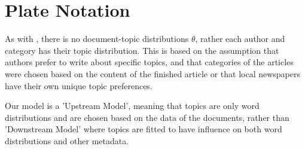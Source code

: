 \section{Plate Notation}
As with , there is no document-topic distributions $\theta$, rather each author and category has their topic distribution.
This is based on the assumption that authors prefer to write about specific topics, and that categories of the articles were chosen based on the content of the finished article or that local newspapers have their own unique topic preferences.

Our model is a 'Upstream Model', meaning that topics are only word distributions and are chosen based on the data of the documents, rather than 'Downstream Model' where topics are fitted to have influence on both word distributions and other metadata.

